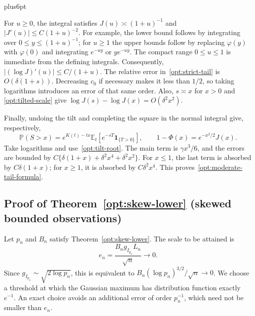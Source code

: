 \documentclass[11pt,letterpaper,twoside,leqno]{article}
\makeatletter
\theoremstyle{bookplain}
\theoremstyle{bookremark}
\renewenvironment{proof}[1][\proofname]{\par
  \pushQED{\qed}\normalfont\topsep6pt plus6pt\relax
  \trivlist\item[\hskip\labelsep\bfseries #1\@addpunct{.}]\ignorespaces
}{\popQED\endtrivlist\@endpefalse}
\newcommand{\E}{\mathbb E}
\newcommand{\Pp}{\mathbb P}
\newcommand{\ind}{\mathbf 1}
\makeatother
\begin{document}
\begin{proof}
For $u\ge0$, the integral satisfies
$J(u)\asymp(1+u)^{-1}$ and $|J'(u)|\le C(1+u)^{-2}$.
For example, the lower bound follows by integrating over
$0\le y\le(1+u)^{-1}$; for $u\ge1$ the upper bounds follow
by replacing $\varphi(y)$ with $\varphi(0)$ and integrating
$e^{-uy}$ or $ye^{-uy}$. The compact range $0\le u\le1$
is immediate from the defining integrals. Consequently,
$|(\log J)'(u)|\le C/(1+u)$.
The relative error in~\eqref{opt:strict-tail} is
$O(\delta(1+s))$. Decreasing $c_0$ if necessary makes it less
than $1/2$, so taking logarithms introduces an error of that
same order. Also, $s\asymp x$ for $x>0$ and
\eqref{opt:tilted-scale} give
$\log J(s)-\log J(x)=O(\delta^2x^2)$.

Finally, undoing the tilt and completing the square in the normal
integral give, respectively,
\[
 \Pp(S>x)=e^{K(t)-tx}\E_t[e^{-sT}\ind_{\{T>0\}}],\qquad
 1-\Phi(x)=e^{-x^2/2}J(x).
\]
Take logarithms and use~\eqref{opt:tilt-root}. The main term is
$\gamma x^3/6$, and the errors are bounded by
$C\{\delta(1+x)+\delta^2x^4+\delta^2x^2\}$.
For $x\le1$, the last term is absorbed by $C\delta(1+x)$;
for $x\ge1$, it is absorbed by $C\delta^2x^4$.
This proves~\eqref{opt:moderate-tail-formula}.
\end{proof}

\subsection{Proof of Theorem~\ref*{opt:skew-lower} (skewed bounded observations)}
\label{app:skew-proof}

Let $p_n$ and $B_n$ satisfy Theorem~\ref{opt:skew-lower}.
The scale to be attained is
\[
 e_n=\frac{B_n g_{I_{p_n}}L_n}{\sqrt n}\longrightarrow0.
\]
Since $g_{I_{p_n}}\sim\sqrt{2\log p_n}$, this is equivalent
to $B_n(\log p_n)^{3/2}/\sqrt n\to0$. We choose a threshold
at which the Gaussian maximum has distribution function exactly
$e^{-1}$. An exact choice avoids an additional error of order
$p_n^{-1}$, which need not be smaller than $e_n$.
\end{document}
